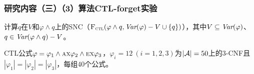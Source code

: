 \documentclass[aspectratio=1610, 9pt, CJK]{beamer}
\begin{document}
\begin{frame}
	\frametitle{研究内容（三）（3）算法CTL-forget实验}
		\textcolor{blue!60}{计算$q$在$V$和$\varphi \wedge q$上的SNC（${\textsc{F}_{\textsc{ctl}}}(\varphi\wedge q, \textit{Var}(\varphi)-V \cup \{q\})$），其中$V\subseteq \textit{Var}(\varphi)$、$q\in \textit{Var}(\varphi\wedge q)-V$。}
		
		CTL公式$\varphi=\varphi_1 \wedge \textsc{a}\textsc{x} \varphi_2 \wedge \textsc{e}\textsc{x} \varphi_3$，$\varphi_i=12~(i=1,2,3)$为$|{\cal A}|=50$上的3-CNF且$|\varphi_1|=|\varphi_2|=|\varphi_3|$，每组40个公式。
		

\end{frame}
\end{document}
